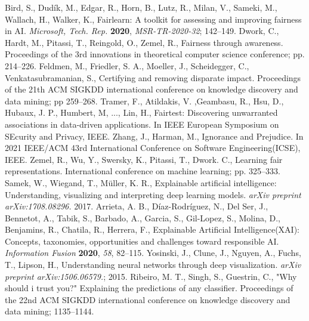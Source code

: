 \documentclass[journal,article,submit,moreauthors,pdftex]{Definitions/mdpi}
\begin{document}
\begin{thebibliography}{999}
Bird, S., Dudík, M., Edgar, R., Horn, B., Lutz, R., Milan, V., Sameki, M., Wallach, H., Walker, K., Fairlearn: A toolkit for assessing and improving fairness in AI. {\em Microsoft, Tech. Rep.} {\bf 2020}, {\em MSR-TR-2020-32}; 142--149.
Dwork, C., Hardt, M., Pitassi, T., Reingold, O., Zemel, R., Fairness through awareness. Proceedings of the 3rd innovations in theoretical computer science conference; pp. 214--226.
Feldmen, M., Friedler, S. A., Moeller, J., Scheidegger, C., Venkatasubramanian, S., Certifying and removing disparate impact. Proceedings of the 21th ACM SIGKDD international conference on knowledge discovery and data mining; pp 259--268.
Tramer, F., Atildakis, V. ,Geambasu, R., Hsu, D., Hubaux, J. P., Humbert, M, ..., Lin, H., Fairtest: Discovering unwarranted associations in data-driven applications. In IEEE European Symposium on SEcurity and Privacy, IEEE.
Zhang, J., Harman, M., Ignorance and Prejudice. In 2021 IEEE/ACM 43rd International Conference on Software Engineering(ICSE), IEEE.
Zemel, R., Wu, Y., Swersky, K., Pitassi, T., Dwork. C., Learning fair representations. International conference on machine learning; pp. 325--333.
Samek, W., Wiegand, T., Müller, K. R., Explainable artificial intelligence: Understanding, visualizing and interpreting deep learning models. \textit{arXiv preprint arXiv:1708.08296.} 2017.
Arrieta, A. B., Díaz-Rodríguez, N., Del Ser, J., Bennetot, A., Tabik, S., Barbado, A., Garcia, S., Gil-Lopez, S., Molina, D., Benjamins, R., Chatila, R., Herrera, F., Explainable Artificial Intelligence(XAI): Concepts, taxonomies, opportunities and challenges toward responsible AI. {\em Information Fusion} {\bf 2020}, {\em 58}, 82--115.
Yosinski, J., Clune, J., Nguyen, A., Fuchs, T., Lipson, H., Understanding neural networks through deep visualization. \textit{arXiv preprint arXiv:1506.06579.}; 2015.
Ribeiro, M. T., Singh, S., Guestrin, C., "Why should i trust you?" Explaining the predictions of any classifier. Proceedings of the 22nd ACM SIGKDD international conference on knowledge discovery and data mining; 1135--1144.

\end{thebibliography}
\end{document}
